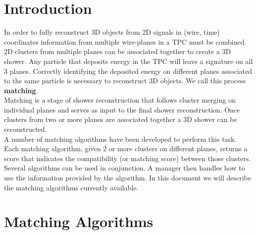 \documentclass{article}
\title{\myTitle}
\author{\myAuthorName}
\date{\today}
\begin{document}
\maketitle

\newpage

\tableofcontents

\newpage


\section{Introduction}
In order to fully reconstruct 3D objects from 2D signals in (wire, time) coordinates information from multiple wire-planes in a TPC must be combined.
2D clusters from multiple planes can be associated together to create a 3D shower. Any particle that deposits energy in the TPC will leave a signature
on all 3 planes. Correctly identifying the deposited energy on different planes associated to the same particle is necessary to reconstruct 3D objects.
We call this process {\bf matching}.\\
Matching is a stage of shower reconstruction that follows cluster merging on individual planes and serves as input to the final shower reconstruction.
Once clusters from two or more planes are associated together a 3D shower can be reconstructed.\\
A number of matching algorithms have been developed to perform this task. Each matching algorithm, given 2 or more clusters on different planes,
returns a score that indicates the compatibility (or matching score) between those clusters. Several algorithms can be used in conjunction. A manager
then handles how to use the information provided by the algorithm. In this document we will describe the matching algorithms currently available.

\newpage

\section{Matching Algorithms}
\end{document}
